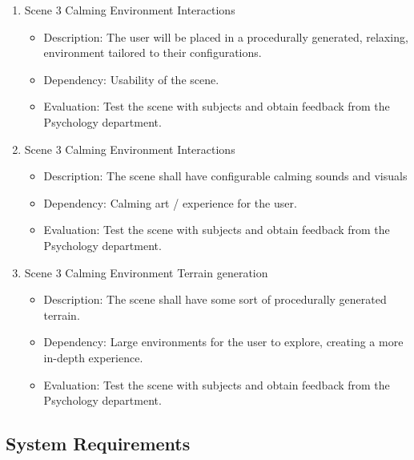 \documentclass[a4paper,10pt]{article}
\begin{document}
\begin{enumerate}
		
		\item Scene 3 Calming Environment Interactions
		\begin{itemize}
		\item Description: The user will be placed in a procedurally generated, relaxing, environment tailored to their configurations.
		\item Dependency: Usability of the scene.
		\item Evaluation: Test the scene with subjects and obtain feedback from the Psychology department. 
		\end{itemize}
		
		\item Scene 3 Calming Environment Interactions 
		\begin{itemize}
		\item Description: The scene shall have configurable calming sounds and visuals
		\item Dependency: Calming art / experience for the user.
		\item Evaluation: Test the scene with subjects and obtain feedback from the Psychology department. 
		\end{itemize}
		
		\item Scene 3 Calming Environment Terrain generation
		\begin{itemize}
		\item Description: The scene shall have some sort of procedurally generated terrain. 
		\item Dependency: Large environments for the user to explore, creating a more in-depth experience.
		\item Evaluation: Test the scene with subjects and obtain feedback from the Psychology department. 
		\end{itemize}
		
	\end{enumerate}

	\subsection{System Requirements}
\end{document}
